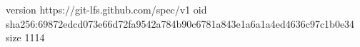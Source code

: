 version https://git-lfs.github.com/spec/v1
oid sha256:69872edcd073e66d72fa9542a784b90c6781a843e1a6a1a4ed4636c97c1b0e34
size 1114
